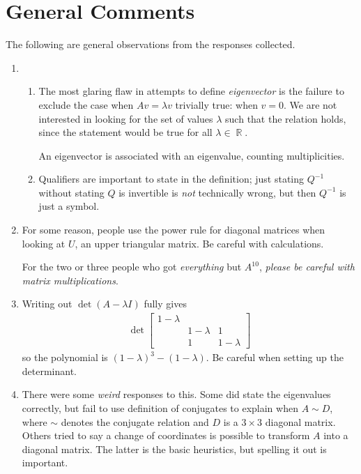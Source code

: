 \documentclass[answers,11pt]{exam}
\theoremstyle{definition}
\DeclareMathOperator{\R}{\mathbb{R}}
\DeclareMathOperator{\1}{\mathbbm{1}}
\begin{document}
\clearpage


\section*{General Comments}

The following are general observations from the responses collected.


\begin{enumerate}
	\item \begin{enumerate}
		\item The most glaring flaw in attempts to define \textit{eigenvector} is the failure to exclude the case when $Av = \lambda v$ trivially true: when $v = 0$. We are not interested in looking for the set of values $\lambda$ such that the relation holds, since the statement would be true for all $\lambda \in \R$.
		
		An eigenvector is associated with an eigenvalue, counting multiplicities.
		
		\item Qualifiers are important to state in the definition; just stating $Q^{-1}$ without stating $Q$ is invertible is \textit{not} technically wrong, but then $Q^{-1}$ is just a symbol.
	\end{enumerate}


	\item For some reason, people use the power rule for diagonal matrices when looking at $U$, an upper triangular matrix. Be careful with calculations.
	
	For the two or three people who got \textit{everything} but $A^{10}$, \textit{please be careful with matrix multiplications}.
	
	
	\item Writing out $\det(A-\lambda I)$ fully gives
	\begin{align*}
	\det \begin{bmatrix}
	1-\lambda & & \\ & 1-\lambda & 1 \\ & 1 & 1-\lambda
	\end{bmatrix}
	\end{align*}
	so the polynomial is $(1-\lambda)^3 - (1-\lambda)$. Be careful when setting up the determinant.
	
	
	\item There were some \textit{weird} responses to this. Some did state the eigenvalues correctly, but fail to use definition of conjugates to explain when $A \sim D$, where $\sim$ denotes the conjugate relation and $D$ is a $3 \times 3$ diagonal matrix. Others tried to say a change of coordinates is possible to transform $A$ into a diagonal matrix. The latter is the basic heuristics, but spelling it out is important.
	

\end{enumerate}
\end{document}
